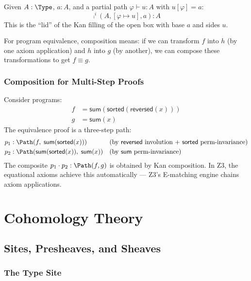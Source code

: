 \begin{definition}
Given $A : \Type$, $a : A$, and a partial path
$\varphi \vdash u : A$ with $u[\varphi] = a$:
\[
  \comp^i(A, [\varphi \mapsto u], a) : A
\]
This is the ``lid'' of the Kan filling of the open box with base $a$
and sides $u$.
\end{definition}

For program equivalence, composition means: if we can transform
$f$ into $h$ (by one axiom application) and $h$ into $g$ (by
another), we can compose these transformations to get $f \equiv g$.

\section{Composition for Multi-Step Proofs}

\begin{example}
Consider programs:
\begin{align}
  f &= \mathsf{sum}(\mathsf{sorted}(\mathsf{reversed}(x))) \\
  g &= \mathsf{sum}(x)
\end{align}
The equivalence proof is a three-step path:
\begin{align}
  p_1 &: \Path(f,\; \mathsf{sum}(\mathsf{sorted}(x)))
    && \text{(by $\mathsf{reversed}$ involution + $\mathsf{sorted}$
    perm-invariance)} \\
  p_2 &: \Path(\mathsf{sum}(\mathsf{sorted}(x)),\; \mathsf{sum}(x))
    && \text{(by $\mathsf{sum}$ perm-invariance)}
\end{align}
The composite $p_1 \cdot p_2 : \Path(f, g)$ is obtained by Kan
composition.  In Z3, the equational axioms achieve this automatically
--- Z3's E-matching engine chains axiom applications.
\end{example}


\part{Cohomology Theory}

\chapter{Sites, Presheaves, and Sheaves}
\label{ch:sheaves}

\section{The Type Site}

